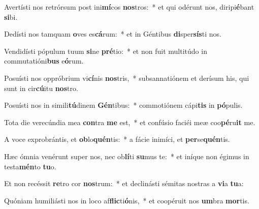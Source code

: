 \item Avertísti nos retrórsum post ini\textbf{mí}cos \textbf{nos}tros:~* et qui odérunt nos, diripi\textbf{é}bant \textbf{si}bi.
\item Dedísti nos tamquam \textbf{o}ves es\textbf{cá}rum:~* et in Géntibus \textbf{di}sper\textbf{sís}ti nos.
\item Vendidísti pópulum tuum \textbf{si}ne \textbf{pré}tio:~* et non fuit multitúdo in commutatióni\textbf{bus} e\textbf{ó}rum.
\item Posuísti nos oppróbrium vi\textbf{cí}nis \textbf{nos}tris,~* subsannatiónem et derísum his, qui sunt in cir\textbf{cú}itu \textbf{nos}tro.
\item Posuísti nos in simili\textbf{tú}dinem \textbf{Gén}tibus:~* commotiónem cápi\textbf{tis} in \textbf{pó}pulis.
\item Tota die verecúndia mea \textbf{con}tra \textbf{me} est,~* et confúsio faciéi meæ coo\textbf{pé}ru\textbf{it} me.
\item A voce exprobrántis, et \textbf{ob}lo\textbf{quén}tis:~* a fácie inimíci, et \textbf{per}se\textbf{quén}tis.
\item Hæc ómnia venérunt super nos, nec ob\textbf{lí}ti \textbf{su}mus te:~* et iníque non égimus in testa\textbf{mén}to \textbf{tu}o.
\item Et non recéssit \textbf{re}tro cor \textbf{nos}trum:~* et declinásti sémitas nostras a \textbf{vi}a \textbf{tu}a:
\item Quóniam humiliásti nos in loco af\textbf{flic}ti\textbf{ó}nis,~* et coopéruit nos \textbf{um}bra \textbf{mor}tis.
